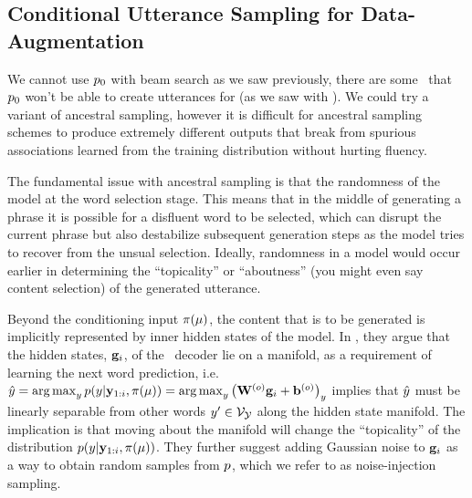 
\subsection{Conditional Utterance Sampling for Data-Augmentation}

We cannot use $p_0$ with beam search as we saw previously,
there are some \meaningrepresentations~that $p_0$ won't be able to create utterances for (as we saw with ). We could try a variant
of ancestral sampling, however 
it is difficult for ancestral sampling schemes to produce 
extremely different outputs that break from spurious associations learned
from the training distribution without hurting fluency. 



The fundamental issue with ancestral sampling is that the randomness of the
model at the word selection stage. This means that in the middle of generating
a phrase it is possible for a disfluent word to be selected, which can
disrupt the current phrase but also destabilize subsequent generation steps
as the model tries to recover from the unsual selection.
Ideally, randomness in a model would occur earlier in determining the 
``topicality'' or ``aboutness'' (you might even say content selection) 
of the generated utterance. 

Beyond the conditioning input $\pi(\mu)$,
the content that is to be generated is implicitly represented by
inner hidden states of the model. 
In \citet{cho2016}, they argue that the hidden states, $\mathbf{g}_i$, 
of the \sequencetosequence~decoder lie on a manifold, as a requirement of
learning the next word prediction, i.e.
$\hat{y} = \operatorname*{arg\,max}_y p(y|\mathbf{y}_{1:i},\pi(\mu)) = 
\operatorname*{arg\,max}_y \left(\mathbf{W}^{(o)}  \mathbf{g}_i + \mathbf{b}^{(o)}\right)_y$ 
implies that $\hat{y}$ must be linearly separable from other 
words $y^\prime \in \mathcal{V}_{\mathcal{Y}}$ along the hidden state manifold. The implication is that moving about the manifold will change 
the ``topicality'' of the distribution $p(y|\mathbf{y}_{1:i},\pi(\mu))$.
They further suggest adding Gaussian noise to $\mathbf{g}_i$ as a way to
obtain random samples from $p$, which we refer to as noise-injection
sampling.




